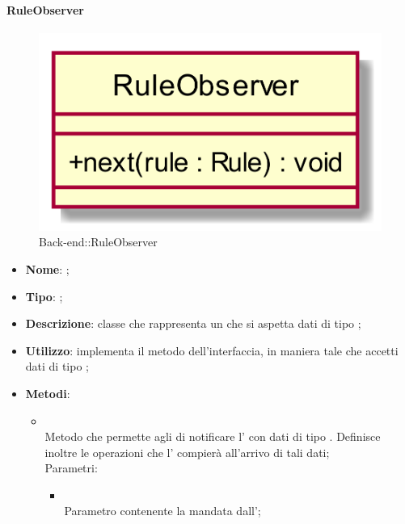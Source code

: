 \hypertarget{RuleObserver_label}{\paragraph{RuleObserver}}
\begin{figure}[h]
	\centering
	\includegraphics[width=\textwidth,height=\textheight,keepaspectratio]{images/ClassRuleObserver.png}
	\caption{Back-end::RuleObserver}
\end{figure}
\begin{itemize}
	\item \textbf{Nome}: ;
	\item \textbf{Tipo}: ;
	\item \textbf{Descrizione}: classe che rappresenta un  che si aspetta dati di tipo ;
	\item \textbf{Utilizzo}: implementa il metodo  dell'interfaccia, in maniera tale che accetti dati di tipo ;
	\item \textbf{Metodi}:
	\begin{itemize}
		\item[]  \\
		Metodo che permette agli  di notificare l' con dati di tipo . Definisce inoltre le operazioni che l' compierà all'arrivo di tali dati;\\
		Parametri:
		\begin{itemize}
			\item {} \\
			Parametro contenente la  mandata dall';
		\end{itemize}
	\end{itemize}
\end{itemize}

